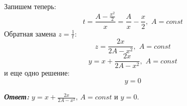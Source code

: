 \documentclass[a5paper, 10pt]{article}
\theoremstyle{definition}
\theoremstyle{plain}
\theoremstyle{remark}
\begin{document}
Запишем теперь:
\begin{equation*} 
 t =  \frac{A -  \frac{x^2}{2}}{x} =  \frac{  A}{x} -  \frac{ x}{2} , \, \, A = const
\end{equation*} 
Обратная замена $ z = \frac{1}{t}$:
\begin{equation*} 
 z =  \frac{2x}{2A - x^2} , \, \, A = const
\end{equation*} 
\begin{equation*} 
 y =   x +  \frac{2x}{2A - x^2} , \, \,  A = const
\end{equation*} 
и еще одно решение:
\begin{equation*} 
 y =   0
\end{equation*} 

\textit{\textbf{Ответ:}} $ y =   x + \frac{2x}{2A - x^2}, \, A = const$ и $ y =   0$.


\newpage
\end{document}
